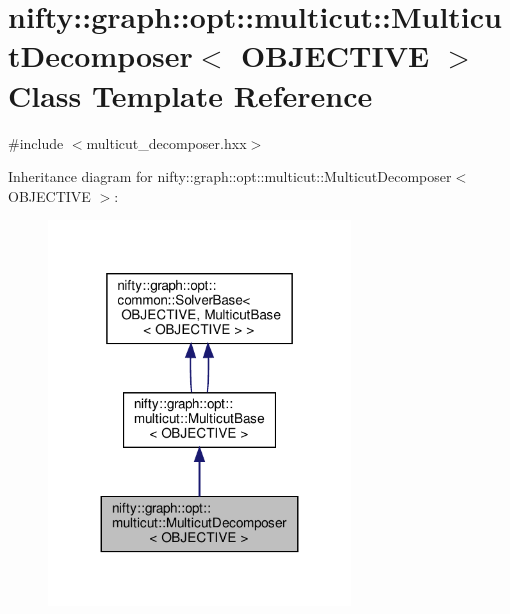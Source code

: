 \hypertarget{classnifty_1_1graph_1_1opt_1_1multicut_1_1MulticutDecomposer}{}\section{nifty\+:\+:graph\+:\+:opt\+:\+:multicut\+:\+:Multicut\+Decomposer$<$ O\+B\+J\+E\+C\+T\+I\+VE $>$ Class Template Reference}
\label{classnifty_1_1graph_1_1opt_1_1multicut_1_1MulticutDecomposer}


{\ttfamily \#include $<$multicut\+\_\+decomposer.\+hxx$>$}



Inheritance diagram for nifty\+:\+:graph\+:\+:opt\+:\+:multicut\+:\+:Multicut\+Decomposer$<$ O\+B\+J\+E\+C\+T\+I\+VE $>$\+:
\nopagebreak
\begin{figure}[H]
\begin{center}
\leavevmode
\includegraphics[width=227pt]{classnifty_1_1graph_1_1opt_1_1multicut_1_1MulticutDecomposer__inherit__graph}
\end{center}
\end{figure}


